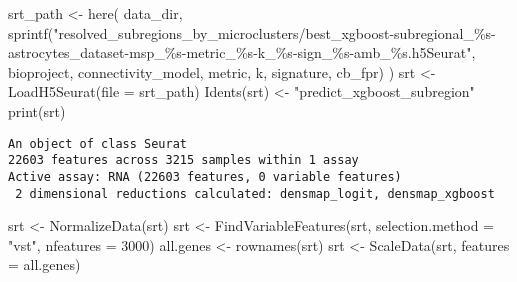 \documentclass[
  letterpaper,
  DIV=11,
  numbers=noendperiod]{scrartcl}
\newenvironment{Shaded}{\begin{snugshade}}{\end{snugshade}}
\newcommand{\AttributeTok}[1]{\textcolor[rgb]{0.40,0.45,0.13}{#1}}
\newcommand{\DecValTok}[1]{\textcolor[rgb]{0.68,0.00,0.00}{#1}}
\newcommand{\FunctionTok}[1]{\textcolor[rgb]{0.28,0.35,0.67}{#1}}
\newcommand{\NormalTok}[1]{\textcolor[rgb]{0.00,0.23,0.31}{#1}}
\newcommand{\OtherTok}[1]{\textcolor[rgb]{0.00,0.23,0.31}{#1}}
\newcommand{\StringTok}[1]{\textcolor[rgb]{0.13,0.47,0.30}{#1}}
\begin{document}
\begin{Shaded}
\begin{Highlighting}[]
\NormalTok{srt\_path }\OtherTok{\textless{}{-}} \FunctionTok{here}\NormalTok{(}
\NormalTok{  data\_dir,}
  \FunctionTok{sprintf}\NormalTok{(}\StringTok{"resolved\_subregions\_by\_microclusters/best\_xgboost{-}subregional\_\%s{-}astrocytes\_dataset{-}msp\_\%s{-}metric\_\%s{-}k\_\%s{-}sign\_\%s{-}amb\_\%s.h5Seurat"}\NormalTok{, bioproject, connectivity\_model, metric, k, signature, cb\_fpr)}
\NormalTok{)}
\NormalTok{srt }\OtherTok{\textless{}{-}} \FunctionTok{LoadH5Seurat}\NormalTok{(}\AttributeTok{file =}\NormalTok{ srt\_path)}
\FunctionTok{Idents}\NormalTok{(srt) }\OtherTok{\textless{}{-}} \StringTok{"predict\_xgboost\_subregion"}
\FunctionTok{print}\NormalTok{(srt)}
\end{Highlighting}
\end{Shaded}

\begin{verbatim}
An object of class Seurat 
22603 features across 3215 samples within 1 assay 
Active assay: RNA (22603 features, 0 variable features)
 2 dimensional reductions calculated: densmap_logit, densmap_xgboost
\end{verbatim}

\begin{Shaded}
\begin{Highlighting}[]
\NormalTok{srt }\OtherTok{\textless{}{-}} \FunctionTok{NormalizeData}\NormalTok{(srt)}
\NormalTok{srt }\OtherTok{\textless{}{-}} \FunctionTok{FindVariableFeatures}\NormalTok{(srt, }\AttributeTok{selection.method =} \StringTok{"vst"}\NormalTok{, }\AttributeTok{nfeatures =} \DecValTok{3000}\NormalTok{)}
\NormalTok{all.genes }\OtherTok{\textless{}{-}} \FunctionTok{rownames}\NormalTok{(srt)}
\NormalTok{srt }\OtherTok{\textless{}{-}} \FunctionTok{ScaleData}\NormalTok{(srt, }\AttributeTok{features =}\NormalTok{ all.genes)}
\end{Highlighting}
\end{Shaded}
\end{document}
